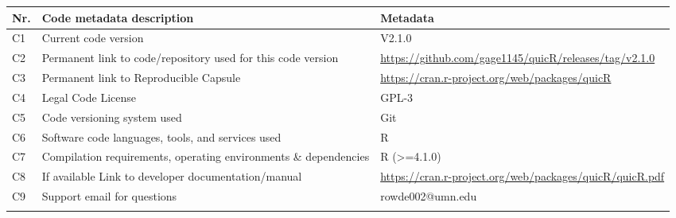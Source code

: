 \documentclass[preprint,12pt,a4paper]{elsarticle}
\providecommand{\DIFaddbeginFL}{} %
\providecommand{\DIFaddendFL}{} %
\providecommand{\DIFdelbeginFL}{} %
\providecommand{\DIFdelendFL}{} %
\begin{document}
    \begin{table}[ht]
        \fontsize{9pt}{9pt}\selectfont
        \centering
        \begin{tabular}{lp{6cm}p{6cm}}
            \DIFdelbeginFL %
\DIFdelendFL \DIFaddbeginFL \hline
            \DIFaddendFL \textbf{Nr.} & \textbf{Code metadata description} & \textbf{Metadata} \\
            \DIFdelbeginFL %
\DIFdelendFL \DIFaddbeginFL \hline
            \DIFaddendFL C1 & Current code version & V2.1.0 \\
C2 & Permanent link to code/repository used for this code version & \url{https://github.com/gage1145/quicR/releases/tag/v2.1.0} \\
C3  & Permanent link to Reproducible Capsule & \url{https://cran.r-project.org/web/packages/quicR}\\
C4 & Legal Code License & GPL-3\\
C5 & Code versioning system used & Git\\
C6 & Software code languages, tools, and services used & R\\
C7 & Compilation requirements, operating environments \& dependencies & R (>=4.1.0)\\
C8 & If available Link to developer documentation/manual & \url{https://cran.r-project.org/web/packages/quicR/quicR.pdf}\\
C9 & Support email for questions & rowde002@umn.edu\\
            \DIFdelbeginFL %
\DIFdelendFL \DIFaddbeginFL \\ \hline
        \DIFaddendFL \end{tabular}
    \end{table}
\end{document}
